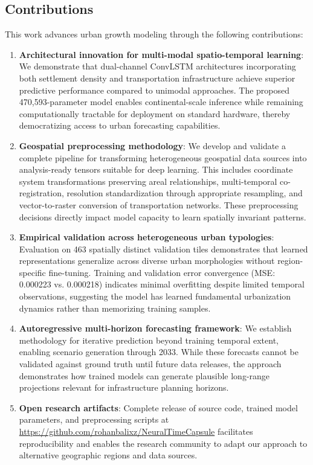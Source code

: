 \documentclass[conference]{IEEEtran}
\begin{document}
\subsection{Contributions}
This work advances urban growth modeling through the following contributions:
\begin{enumerate}
    \item \textbf{Architectural innovation for multi-modal spatio-temporal learning}: We demonstrate that dual-channel ConvLSTM architectures incorporating both settlement density and transportation infrastructure achieve superior predictive performance compared to unimodal approaches. The proposed 470,593-parameter model enables continental-scale inference while remaining computationally tractable for deployment on standard hardware, thereby democratizing access to urban forecasting capabilities.
    
    \item \textbf{Geospatial preprocessing methodology}: We develop and validate a complete pipeline for transforming heterogeneous geospatial data sources into analysis-ready tensors suitable for deep learning. This includes coordinate system transformations preserving areal relationships, multi-temporal co-registration, resolution standardization through appropriate resampling, and vector-to-raster conversion of transportation networks. These preprocessing decisions directly impact model capacity to learn spatially invariant patterns.
    
    \item \textbf{Empirical validation across heterogeneous urban typologies}: Evaluation on 463 spatially distinct validation tiles demonstrates that learned representations generalize across diverse urban morphologies without region-specific fine-tuning. Training and validation error convergence (MSE: 0.000223 vs. 0.000218) indicates minimal overfitting despite limited temporal observations, suggesting the model has learned fundamental urbanization dynamics rather than memorizing training samples.
    
    \item \textbf{Autoregressive multi-horizon forecasting framework}: We establish methodology for iterative prediction beyond training temporal extent, enabling scenario generation through 2033. While these forecasts cannot be validated against ground truth until future data releases, the approach demonstrates how trained models can generate plausible long-range projections relevant for infrastructure planning horizons.
    
    \item \textbf{Open research artifacts}: Complete release of source code, trained model parameters, and preprocessing scripts at \url{https://github.com/rohanbalixz/NeuralTimeCapsule} facilitates reproducibility and enables the research community to adapt our approach to alternative geographic regions and data sources.
\end{enumerate}
\end{document}

